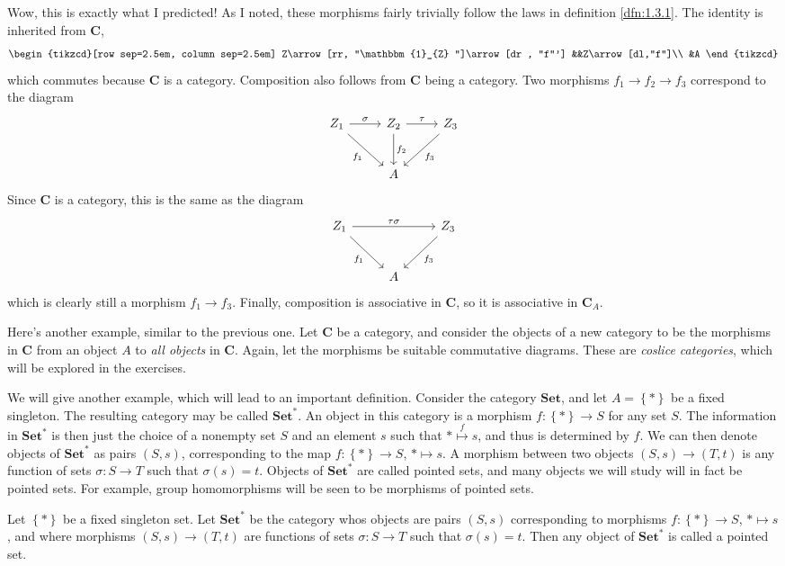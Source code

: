 Wow, this is exactly what I predicted! As I noted, these morphisms fairly trivially follow the laws in definition \ref{dfn:1.3.1}. The identity is inherited from $\mathbf{C}$,
\[\begin{tikzcd}[row sep=2.5em, column sep=2.5em]
	Z\arrow[rr, "\mathbbm{1}_{Z} "]\arrow[dr , "f"'] &&Z\arrow[dl,"f"]\\
				       &A
\end{tikzcd}\]
which commutes because $\mathbf{C}$ is a category. Composition also follows from $\mathbf{C}$ being a category. Two morphisms $f_1 \to f_2 \to f_3$ correspond to the diagram
\[\begin{tikzcd}[row sep=2.5em, column sep=2.5em]
	Z_1 \arrow[r, "\sigma "] \arrow[dr, "f_1"'] & Z_2 \arrow[d, "f_2"] \arrow[r, "\tau "] & Z_3 \arrow[dl, "f_3"]\\
						    &A
\end{tikzcd}\]
Since $\mathbf{C}$ is a category, this is the same as the diagram
\[\begin{tikzcd}[row sep=2.5em, column sep=2.5em]
	Z_1 \arrow[rr, "\tau \sigma "] \arrow[dr, "f_1"'] && Z_3 \arrow[ld, "f_3"]\\
				       &A
\end{tikzcd}\]
which is clearly still a morphism $f_1 \to f_3$. Finally, composition is associative in $\mathbf{C}$, so it is associative in $\mathbf{C}_A$.

Here's another example, similar to the previous one. Let $\mathbf{C}$ be a category, and consider the objects of a new category to be the morphisms in $\mathbf{C}$ from an object $A$ to \emph{all objects} in $\mathbf{C}$. Again, let the morphisms be suitable commutative diagrams. These are \emph{coslice categories}, which will be explored in the exercises.

We will give another example, which will lead to an important definition. Consider the category $\mathbf{Set}$, and let $A=\left\{ * \right\} $ be a fixed singleton. The resulting category may be called $\mathbf{Set}^*$. An object in this category is a morphism $f : \left\{ * \right\}  \to S$ for any set $S$. The information in $\mathbf{Set}^*$ is then just the choice of a nonempty set $S$ and an element $s$ such that $*\overset{f}{\mapsto} s$, and thus is determined by $f$. We can then denote objects of $\mathbf{Set}^*$ as pairs $(S,s)$, corresponding to the map $f : \left\{ * \right\}  \to S$, $*\mapsto s$. A morphism between two objects $(S,s)\to (T,t)$ is any function of sets $\sigma : S \to T$ such that $\sigma (s)=t$. Objects of $\mathbf{Set}^*$ are called pointed sets, and many objects we will study will in fact be pointed sets. For example, group homomorphisms will be seen to be morphisms of pointed sets.
\begin{definition}\label{dfn:1.3.6}
	Let $\left\{ * \right\} $ be a fixed singleton set. Let $\mathbf{Set}^*$ be the category whos objects are pairs $(S,s)$ corresponding to morphisms $f : \left\{ * \right\}  \to S$, $*\mapsto s$, and where morphisms $(S,s)\to (T,t)$ are functions of sets $\sigma : S \to T$ such that $\sigma (s)=t$. Then any object of $\mathbf{Set}^*$ is called a pointed set.
\end{definition}

